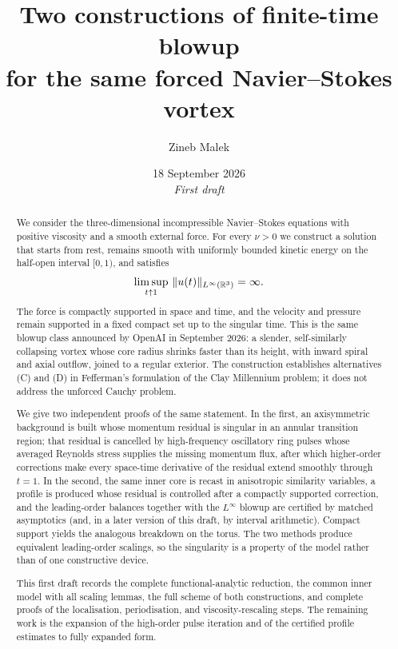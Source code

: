 \theoremstyle{remark}
\newtheorem*{acknowledgements*}{Acknowledgements}


\title[Two constructions of forced Navier--Stokes blowup]{Two constructions of finite-time blowup\\ for the same forced {N}avier--{S}tokes vortex}

\author{Zineb Malek}
\date{18 September 2026\\[0.4em]\textit{First draft}}




\begin{abstract}
We consider the three-dimensional incompressible {N}avier--{S}tokes equations with positive viscosity and a smooth external force. For every $\nu>0$ we construct a solution that starts from rest, remains smooth with uniformly bounded kinetic energy on the half-open interval $[0,1)$, and satisfies
\[
\limsup_{t\uparrow 1}\,\|u(t)\|_{L^\infty(\mathbb{R}^3)}=\infty.
\]
The force is compactly supported in space and time, and the velocity and pressure remain supported in a fixed compact set up to the singular time. This is the same blowup class announced by {O}pen{AI} in September 2026: a slender, self-similarly collapsing vortex whose core radius shrinks faster than its height, with inward spiral and axial outflow, joined to a regular exterior. The construction establishes alternatives (C) and (D) in {F}efferman's formulation of the {C}lay {M}illennium problem; it does not address the unforced Cauchy problem.

We give two independent proofs of the same statement. In the first, an axisymmetric background is built whose momentum residual is singular in an annular transition region; that residual is cancelled by high-frequency oscillatory ring pulses whose averaged {R}eynolds stress supplies the missing momentum flux, after which higher-order corrections make every space-time derivative of the residual extend smoothly through $t=1$. In the second, the same inner core is recast in anisotropic similarity variables, a profile is produced whose residual is controlled after a compactly supported correction, and the leading-order balances together with the $L^\infty$ blowup are certified by matched asymptotics (and, in a later version of this draft, by interval arithmetic). Compact support yields the analogous breakdown on the torus. The two methods produce equivalent leading-order scalings, so the singularity is a property of the model rather than of one constructive device.

This first draft records the complete functional-analytic reduction, the common inner model with all scaling lemmas, the full scheme of both constructions, and complete proofs of the localisation, periodisation, and viscosity-rescaling steps. The remaining work is the expansion of the high-order pulse iteration and of the certified profile estimates to fully expanded form.
\end{abstract}


